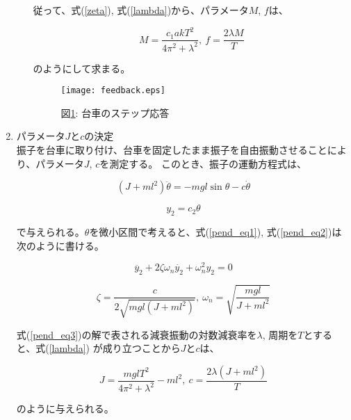 \documentclass[a4j,11pt,twoside]{jbook}
\begin{document}
\begin{enumerate}
\begin{itemize}
        従って、式(\ref{zeta}), 式(\ref{lambda})から、パラメータ$M$, $f$は、

        \begin{equation}
            M = \frac{c_{1}akT^2}{4\pi^2 + \lambda^2},\
            f = \frac{2\lambda M}{T}
        \end{equation}

        のようにして求まる。

        \begin{figure}[htbp]
            \begin{center}
                \texttt{[image: feedback.eps]}
                \caption{図\ref{feedback}: 台車のステップ応答}
                \label{feedback}
            \end{center}
        \end{figure}

    \end{itemize}

    \item パラメータ$J$と$c$の決定 \\
    \quad 振子を台車に取り付け、台車を固定したまま振子を自由振動させることにより、パラメータ$J$, $c$を測定する。
    このとき、振子の運動方程式は、

    \begin{equation}
        (J + ml^2) \ddot{\theta} = -mgl\sin{\theta} - c \dot{\theta}
        \label{pend_eq1}
    \end{equation}

    \begin{equation}
        y_{2} = c_{2} \theta
        \label{pend_eq2}
    \end{equation}

    で与えられる。$\theta$を微小区間で考えると、式(\ref{pend_eq1}), 式(\ref{pend_eq2})は次のように書ける。

    \begin{equation}
        \ddot{y_2} + 2\zeta \omega_{n} \dot{y_{2}} + \omega_{n}^2y_{2} = 0
        \label{pend_eq3}
    \end{equation}

    \begin{equation}
        \zeta = \frac{c}{2\sqrt{mgl(J + ml^2)}},\
        \omega_{n} = \sqrt{\frac{mgl}{J + ml^2}}
    \end{equation}

    式(\ref{pend_eq3})の解で表される減衰振動の対数減衰率を$\lambda$, 周期を$T$とすると、式(\ref{lambda})
    が成り立つことから$J$と$c$は、

    \begin{equation}
        J = \frac{mglT^2}{4\pi^2 + \lambda^2} - ml^2,\
        c = \frac{2\lambda (J + ml^2)}{T}
    \end{equation}

    のように与えられる。

\end{enumerate}
\end{document}
